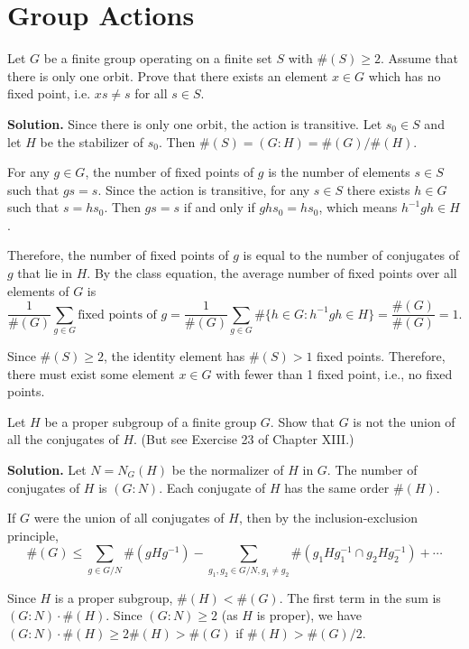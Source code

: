\section{Group Actions}

\begin{problembox}
Let $G$ be a finite group operating on a finite set $S$ with $\#(S) \geq 2$. Assume that there is only one orbit. Prove that there exists an element $x \in G$ which has no fixed point, i.e. $xs \neq s$ for all $s \in S$.
\end{problembox}

\noindent\textbf{Solution.} Since there is only one orbit, the action is transitive. Let $s_0 \in S$ and let $H$ be the stabilizer of $s_0$. Then $\#(S) = (G : H) = \#(G)/\#(H)$.

For any $g \in G$, the number of fixed points of $g$ is the number of elements $s \in S$ such that $gs = s$. Since the action is transitive, for any $s \in S$ there exists $h \in G$ such that $s = hs_0$. Then $gs = s$ if and only if $ghs_0 = hs_0$, which means $h^{-1}gh \in H$.

Therefore, the number of fixed points of $g$ is equal to the number of conjugates of $g$ that lie in $H$. By the class equation, the average number of fixed points over all elements of $G$ is
\[\frac{1}{\#(G)} \sum_{g \in G} \text{fixed points of } g = \frac{1}{\#(G)} \sum_{g \in G} \#\{h \in G : h^{-1}gh \in H\} = \frac{\#(G)}{\#(G)} = 1.\]

Since $\#(S) \geq 2$, the identity element has $\#(S) > 1$ fixed points. Therefore, there must exist some element $x \in G$ with fewer than 1 fixed point, i.e., no fixed points.

\begin{problembox}
Let $H$ be a proper subgroup of a finite group $G$. Show that $G$ is not the union of all the conjugates of $H$. (But see Exercise 23 of Chapter XIII.)
\end{problembox}

\noindent\textbf{Solution.} Let $N = N_G(H)$ be the normalizer of $H$ in $G$. The number of conjugates of $H$ is $(G : N)$. Each conjugate of $H$ has the same order $\#(H)$.

If $G$ were the union of all conjugates of $H$, then by the inclusion-exclusion principle,
\[\#(G) \leq \sum_{g \in G/N} \#(gHg^{-1}) - \sum_{g_1, g_2 \in G/N, g_1 \neq g_2} \#(g_1Hg_1^{-1} \cap g_2Hg_2^{-1}) + \cdots\]

Since $H$ is a proper subgroup, $\#(H) < \#(G)$. The first term in the sum is $(G : N) \cdot \#(H)$. Since $(G : N) \geq 2$ (as $H$ is proper), we have $(G : N) \cdot \#(H) \geq 2\#(H) > \#(G)$ if $\#(H) > \#(G)/2$.

